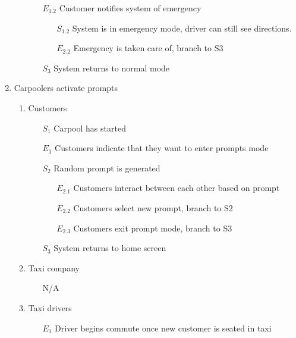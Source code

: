 \documentclass[]{article}
\begin{document}
\begin{enumerate}[{\textbf{BE}}1.]
\begin{enumerate}[{VP6}.1]
\begin{enumerate}
\begin{enumerate}
                    \end{enumerate}
                \item[$E_{1.2}$] Customer notifies system of emergency
                \begin{enumerate}
                    \item[$S_{1.2}$] System is in emergency mode, driver can still see directions.
                    \item[$E_{2.2}$] Emergency is taken care of, branch to S3
                \end{enumerate}
                \item[$S_3$] System returns to normal mode
            \end{enumerate}
    \end{enumerate}
    \item Carpoolers activate prompts
    \begin{enumerate}[{VP7}.1]
        \item Customers
            \begin{enumerate}
                \item[$S_1$] Carpool has started
                \item[$E_1$] Customers indicate that they want to enter prompts mode
                \item[$S_2$] Random prompt is generated
                \begin{enumerate}
                    \item[$E_{2.1}$] Customers interact between each other based on prompt
                    \item[$E_{2.2}$] Customers select new prompt, branch to S2
                    \item[$E_{2.3}$] Customers exit prompt mode, branch to S3
                \end{enumerate}
                \item[$S_3$] System returns to home screen
            \end{enumerate}
        \item Taxi company
            \begin{enumerate}
                \item[N/A]
            \end{enumerate}
        \item Taxi drivers
            \begin{enumerate}
                \item[$E_1$] Driver begins commute once new customer is seated in taxi

\end{enumerate}
\end{enumerate}
\end{enumerate}
\end{document}
